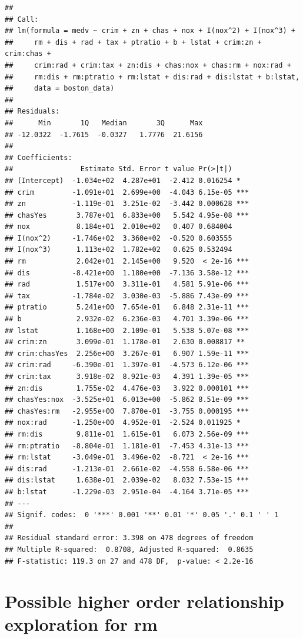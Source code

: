 \documentclass[
]{article}
\begin{document}
\begin{verbatim}
## 
## Call:
## lm(formula = medv ~ crim + zn + chas + nox + I(nox^2) + I(nox^3) + 
##     rm + dis + rad + tax + ptratio + b + lstat + crim:zn + crim:chas + 
##     crim:rad + crim:tax + zn:dis + chas:nox + chas:rm + nox:rad + 
##     rm:dis + rm:ptratio + rm:lstat + dis:rad + dis:lstat + b:lstat, 
##     data = boston_data)
## 
## Residuals:
##      Min       1Q   Median       3Q      Max 
## -12.0322  -1.7615  -0.0327   1.7776  21.6156 
## 
## Coefficients:
##                Estimate Std. Error t value Pr(>|t|)    
## (Intercept)  -1.034e+02  4.287e+01  -2.412 0.016254 *  
## crim         -1.091e+01  2.699e+00  -4.043 6.15e-05 ***
## zn           -1.119e-01  3.251e-02  -3.442 0.000628 ***
## chasYes       3.787e+01  6.833e+00   5.542 4.95e-08 ***
## nox           8.184e+01  2.010e+02   0.407 0.684004    
## I(nox^2)     -1.746e+02  3.360e+02  -0.520 0.603555    
## I(nox^3)      1.113e+02  1.782e+02   0.625 0.532494    
## rm            2.042e+01  2.145e+00   9.520  < 2e-16 ***
## dis          -8.421e+00  1.180e+00  -7.136 3.58e-12 ***
## rad           1.517e+00  3.311e-01   4.581 5.91e-06 ***
## tax          -1.784e-02  3.030e-03  -5.886 7.43e-09 ***
## ptratio       5.241e+00  7.654e-01   6.848 2.31e-11 ***
## b             2.932e-02  6.236e-03   4.701 3.39e-06 ***
## lstat         1.168e+00  2.109e-01   5.538 5.07e-08 ***
## crim:zn       3.099e-01  1.178e-01   2.630 0.008817 ** 
## crim:chasYes  2.256e+00  3.267e-01   6.907 1.59e-11 ***
## crim:rad     -6.390e-01  1.397e-01  -4.573 6.12e-06 ***
## crim:tax      3.918e-02  8.921e-03   4.391 1.39e-05 ***
## zn:dis        1.755e-02  4.476e-03   3.922 0.000101 ***
## chasYes:nox  -3.525e+01  6.013e+00  -5.862 8.51e-09 ***
## chasYes:rm   -2.955e+00  7.870e-01  -3.755 0.000195 ***
## nox:rad      -1.250e+00  4.952e-01  -2.524 0.011925 *  
## rm:dis        9.811e-01  1.615e-01   6.073 2.56e-09 ***
## rm:ptratio   -8.804e-01  1.181e-01  -7.453 4.31e-13 ***
## rm:lstat     -3.049e-01  3.496e-02  -8.721  < 2e-16 ***
## dis:rad      -1.213e-01  2.661e-02  -4.558 6.58e-06 ***
## dis:lstat     1.638e-01  2.039e-02   8.032 7.53e-15 ***
## b:lstat      -1.229e-03  2.951e-04  -4.164 3.71e-05 ***
## ---
## Signif. codes:  0 '***' 0.001 '**' 0.01 '*' 0.05 '.' 0.1 ' ' 1
## 
## Residual standard error: 3.398 on 478 degrees of freedom
## Multiple R-squared:  0.8708, Adjusted R-squared:  0.8635 
## F-statistic: 119.3 on 27 and 478 DF,  p-value: < 2.2e-16
\end{verbatim}

\section{Possible higher order relationship exploration for
rm}\label{possible-higher-order-relationship-exploration-for-rm}
\end{document}

